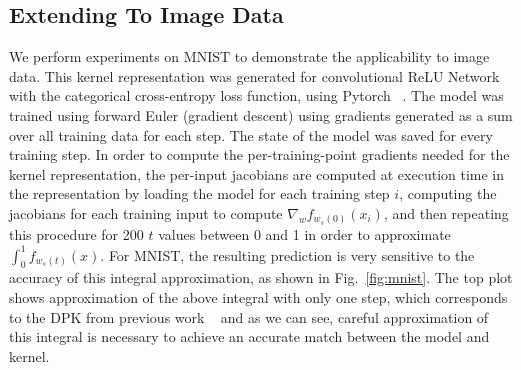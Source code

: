 \subsection{Extending To Image Data}
    We perform experiments on MNIST to demonstrate the applicability to image data. 
    This kernel representation was generated for convolutional ReLU Network with the categorical cross-entropy loss function, using Pytorch ~\citep{pytorch2019}. 
    The model was trained using forward Euler (gradient descent) using gradients generated as a sum over all training data for each step. 
    The state of the model was saved for every training step. In order to compute the per-training-point gradients needed for the kernel representation, the per-input jacobians are computed at execution time in the representation by loading the model for each training step $i$, computing the jacobians for each training input to compute $\nabla_w f_{w_s(0)}(x_i)$, and then repeating this procedure for 200 $t$ values between 0 and 1 in order to approximate $\int_0^1 f_{w_s(t)}(x)$. For MNIST, the resulting prediction is very sensitive to the accuracy of this integral approximation, as shown in Fig.~\ref{fig:mnist}. The top plot shows approximation of the above integral with only one step, which corresponds to the DPK from previous work ~\citep{chen2021equivalence, domingos2020, incudini2022quantum} and as we can see, careful approximation of this integral is necessary to achieve an accurate match between the model and kernel. 

